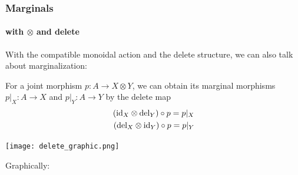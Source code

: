 \begin{frame}[t]
    \frametitle{Marginals}
    \framesubtitle{with $\otimes$ and delete}
    \vspace{5mm}
    \begin{minipage}{.55\textwidth}
        With the compatible monoidal action and the delete structure, we can also talk about marginalization:\par
        For a joint morphism ${p: A\to X\otimes Y}$, we can obtain its marginal morphisms ${p|_X: A\to X}$ and ${p|_Y: A\to Y}$ by the delete map
        \begin{align*}
            (\text{\normalfont id} _X \otimes \text{\normalfont del} _Y) \circ p = p|_X\\
            (\text{\normalfont del} _X \otimes \text{\normalfont id} _Y) \circ p = p|_Y\\
        \end{align*}
    \end{minipage}
    \hfill
    \begin{minipage}{.35\textwidth}
        \texttt{[image: delete\_graphic.png]}
    \end{minipage}
\end{frame}

\begin{frame}[t]
    Graphically:
    \vspace{10mm}

    \begin{minipage}{.48\textwidth}
    \end{minipage}
    \hfill
    \begin{minipage}{.48\textwidth}
    \end{minipage}
    \vspace{10mm}
    \pause

    \begin{minipage}{.48\textwidth}
    \end{minipage}
    \hfill
    \begin{minipage}{.48\textwidth}
    \end{minipage}
\end{frame}

